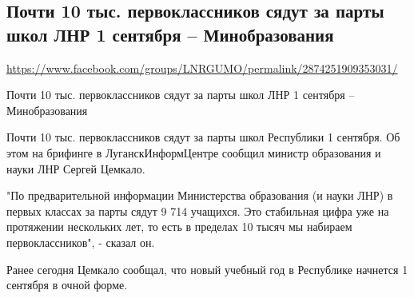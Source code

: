  
 
\subsection{Почти 10 тыс. первоклассников сядут за парты школ ЛНР 1 сентября – Минобразования}
\url{https://www.facebook.com/groups/LNRGUMO/permalink/2874251909353031/}

Почти 10 тыс. первоклассников сядут за парты школ ЛНР 1 сентября –
Минобразования

Почти 10 тыс. первоклассников сядут за парты школ Республики 1 сентября. Об
этом на брифинге в ЛуганскИнформЦентре сообщил министр образования и науки ЛНР
Сергей Цемкало.

"По предварительной информации Министерства образования (и науки ЛНР) в первых
классах за парты сядут 9 714 учащихся. Это стабильная цифра уже на протяжении
нескольких лет, то есть в пределах 10 тысяч мы набираем первоклассников", -
сказал он.

Ранее сегодня Цемкало сообщал, что новый учебный год в Республике начнется 1
сентября в очной форме.
  
